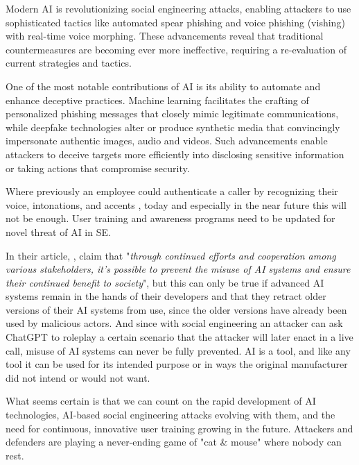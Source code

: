 Modern AI is revolutionizing social engineering attacks, enabling attackers to use sophisticated tactics like automated spear phishing and voice phishing (vishing) with real-time voice morphing. These advancements reveal that traditional countermeasures are becoming ever more ineffective, requiring a re-evaluation of current strategies and tactics.


One of the most notable contributions of AI is its ability to automate and enhance deceptive practices. Machine learning facilitates the crafting of personalized phishing messages that closely mimic legitimate communications, while deepfake technologies alter or produce synthetic media that convincingly impersonate authentic images, audio and videos. Such advancements enable attackers to deceive targets more efficiently into disclosing sensitive information or taking actions that compromise security.

Where previously an employee could authenticate a caller by recognizing their voice, intonations, and accents \citep{mitnickArtDeceptionControlling2003}, today and especially in the near future this will not be enough. User training and awareness programs need to be updated for novel threat of AI in SE.

In their article, \cite{guptaFromChatGPTtoThreatGPT2023}, claim that "\textit{through continued efforts and cooperation among various stakeholders, it’s possible to prevent the misuse of AI systems and ensure their continued benefit to society}", but this can only be true if advanced AI systems remain in the hands of their developers and that they retract older versions of their AI systems from use, since the older versions have already been used by malicious actors. And since with social engineering an attacker can ask ChatGPT to roleplay a certain scenario that the attacker will later enact in a live call, misuse of AI systems can never be fully prevented. AI is a tool, and like any tool it can be used for its intended purpose or in ways the original manufacturer did not intend or would not want.

What seems certain is that we can count on the rapid development of AI technologies, AI-based social engineering attacks evolving with them, and the need for continuous, innovative user training growing in the future. Attackers and defenders are playing a never-ending game of "cat \& mouse" where nobody can rest.

